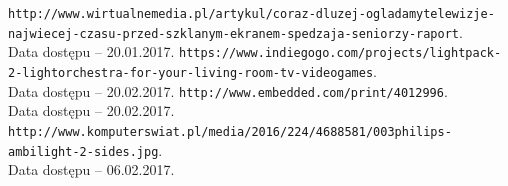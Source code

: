 \documentclass[12pt]{report}
\begin{document}
\begin{thebibliography}{99}
 {\tt http://www.wirtualnemedia.pl/artykul/coraz-dluzej-ogladamy\-telewizje-najwiecej-czasu-przed-szklanym-ekranem-spedzaja\--seniorzy-raport}.\\Data dostępu -- 20.01.2017.
 {\tt https://www.indiegogo.com/projects/lightpack-2-light\-orchestra-for-your-living-room-tv-videogames}. \\Data dostępu -- 20.02.2017.
 {\tt http://www.embedded.com/print/4012996}. \\Data dostępu -- 20.02.2017.
 {\tt http://www.komputerswiat.pl/media/2016/224/4688581/003\-philips-ambilight-2-sides.jpg}. \\Data dostępu -- 06.02.2017.


\end{thebibliography}
\end{document}

